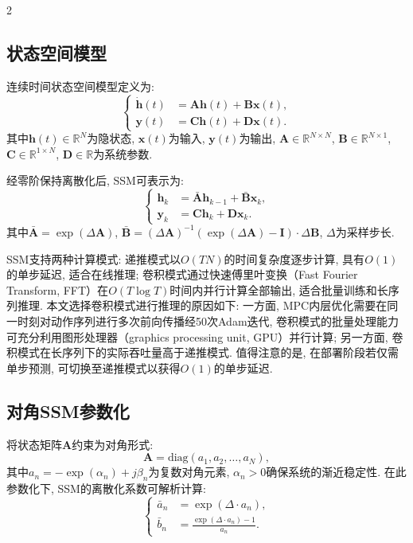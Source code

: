 \begin{multicols}{2}
\subsection{状态空间模型}

连续时间状态空间模型定义为:
\begin{equation}
\left\{\begin{aligned}
\dot{{\bm h}}(t) &= {\bm A}{\bm h}(t) + {\bm B}{\bm x}(t),\\
{\bm y}(t) &= {\bm C}{\bm h}(t) + {\bm D}{\bm x}(t).
\end{aligned}\right.
\end{equation}
其中${\bm h}(t) \in \mathbb{R}^{N}$为隐状态, ${\bm x}(t)$为输入, ${\bm y}(t)$为输出,
${\bm A} \in \mathbb{R}^{N \times N}$, ${\bm B} \in \mathbb{R}^{N \times 1}$,
${\bm C} \in \mathbb{R}^{1 \times N}$, ${\bm D} \in \mathbb{R}$为系统参数.

经零阶保持离散化后, SSM可表示为:
\begin{equation}
\left\{\begin{aligned}
{\bm h}_k &= \bar{{\bm A}}{\bm h}_{k-1} + \bar{{\bm B}}{\bm x}_k,\\
{\bm y}_k &= {\bm C}{\bm h}_k + {\bm D}{\bm x}_k.
\end{aligned}\right.
\end{equation}
其中$\bar{{\bm A}} = \exp(\Delta {\bm A})$, $\bar{{\bm B}} = (\Delta {\bm A})^{-1}(\exp(\Delta {\bm A}) - {\bm I}) \cdot \Delta {\bm B}$,
$\Delta$为采样步长.

SSM支持两种计算模式: 递推模式以$O(TN)$的时间复杂度逐步计算, 具有$O(1)$的单步延迟, 适合在线推理; 卷积模式通过快速傅里叶变换（Fast Fourier Transform, FFT）在$O(T\log T)$时间内并行计算全部输出, 适合批量训练和长序列推理.
本文选择卷积模式进行推理的原因如下:
一方面, MPC内层优化需要在同一时刻对动作序列进行多次前向传播经50次Adam迭代, 卷积模式的批量处理能力可充分利用图形处理器（graphics processing unit, GPU）并行计算; 另一方面, 卷积模式在长序列下的实际吞吐量高于递推模式.
值得注意的是, 在部署阶段若仅需单步预测, 可切换至递推模式以获得$O(1)$的单步延迟.

\subsection{对角SSM参数化}

将状态矩阵${\bm A}$约束为对角形式:
\begin{equation}
{\bm A} = \text{diag}(a_1, a_2, \ldots, a_N),
\end{equation}
其中$a_n = -\exp(\alpha_n) + j\beta_n$为复数对角元素,
$\alpha_n > 0$确保系统的渐近稳定性.
在此参数化下, SSM的离散化系数可解析计算:
\begin{equation}
\left\{\begin{aligned}
\bar{a}_n &= \exp(\Delta \cdot a_n), \\
\bar{b}_n &= \frac{\exp(\Delta \cdot a_n) - 1}{a_n}.
\end{aligned}\right.
\end{equation}


\end{multicols}
